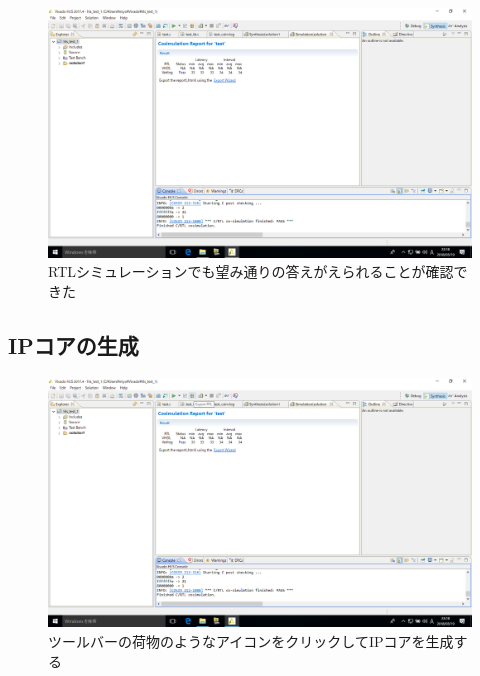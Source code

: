 \documentclass[a4paper,dvipdfmx]{jsarticle}
\begin{document}
 \begin{figure}[H]
  \begin{center}
   \includegraphics[width=.8\textwidth]{chapter08_figures/VirtualBox_Windows10_19_03_2018_23_20_14.png}
  \end{center}
  \caption{RTLシミュレーションでも望み通りの答えがえられることが確認できた}
 \end{figure}

  \subsection{IPコアの生成}

 \begin{figure}[H]
  \begin{center}
   \includegraphics[width=.8\textwidth]{chapter08_figures/VirtualBox_Windows10_19_03_2018_23_20_28.png}
  \end{center}
  \caption{ツールバーの荷物のようなアイコンをクリックしてIPコアを生成する}
 \end{figure}
\end{document}
